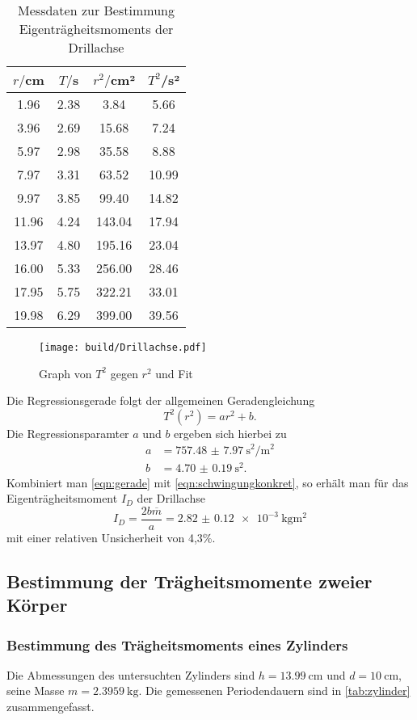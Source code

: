 \begin{table}
\centering
\caption{Messdaten zur Bestimmung Eigenträgheitsmoments der Drillachse}
\label{tab:drillachse}
\begin{tabular}{c c c c}
\toprule
$r/$cm & $T/$s & $r^2/$cm² & $T^2$/s² \\
\midrule
 1.96 & 2.38 &   3.84 &  5.66 \\
 3.96 & 2.69 &  15.68 &  7.24 \\
 5.97 & 2.98 &  35.58 &  8.88 \\
 7.97 & 3.31 &  63.52 & 10.99 \\
 9.97 & 3.85 &  99.40 & 14.82 \\
11.96 & 4.24 & 143.04 & 17.94 \\
13.97 & 4.80 & 195.16 & 23.04 \\
16.00 & 5.33 & 256.00 & 28.46 \\
17.95 & 5.75 & 322.21 & 33.01 \\
19.98 & 6.29 & 399.00 & 39.56 \\
\bottomrule
\end{tabular}
\end{table}
\begin{figure}
  \centering
  \texttt{[image: build/Drillachse.pdf]}
  \caption{Graph von $T^2$ gegen $r^2$ und Fit}
  \label{fig:drillachse}
\end{figure}
Die Regressionsgerade folgt der allgemeinen Geradengleichung
\begin{equation}
  T^2(r^2) = ar^2+b.
  \label{eqn:gerade}
\end{equation}
Die Regressionsparamter $a$ und $b$ ergeben sich hierbei zu
\begin{align}
  a &= \SI{757.48(797)}{\second\squared/\meter\squared}\\
  b &= \SI{4.70(019)}{\second\squared}.
\end{align}
Kombiniert man \eqref{eqn:gerade} mit \eqref{eqn:schwingungkonkret}, so erhält man für
das Eigenträgheitsmoment $I_D$ der Drillachse
\begin{equation}
  I_D = \frac{2b\overline{m}}{a} = \SI{2.82(012)e-3}{\kilogram\meter\squared}
\end{equation}
mit einer relativen Unsicherheit von 4,3\%.
\subsection{Bestimmung der Trägheitsmomente zweier Körper}
\subsubsection{Bestimmung des Trägheitsmoments eines Zylinders}
Die Abmessungen des untersuchten Zylinders sind $h=\SI{13.99}{\cm}$ und
$d=\SI{10}{\cm}$, seine Masse $m=\SI{2.3959}{\kilogram}$. Die gemessenen
Periodendauern sind in \ref{tab:zylinder} zusammengefasst.

